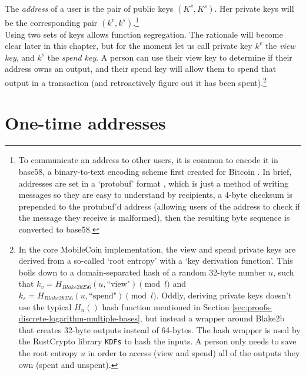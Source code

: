 The {\em address} of a user is the pair of public keys \((K^v, K^s)\). Her private keys will be the corresponding pair \( (k^v, k^s) \).\footnote{To communicate an address to other users, it is common to encode it in base58, a binary-to-text encoding scheme first created for Bitcoin \cite{base-58-encoding}. In brief, addresses are set in a `protobuf' format \cite{protubuf-encoding}, which is just a method of writing messages so they are easy to understand by recipients, a 4-byte checksum is prepended to the protubuf'd address (allowing users of the address to check if the message they receive is malformed), then the resulting byte sequence is converted to base58.}
\\

Using two sets of keys allows function segregation. The rationale will become clear later in this chapter, but for the moment let us call private key $k^v$ the {\em view key}, and $k^s$ the {\em spend key}. A person can use their view key to determine if their address owns an output, and their spend key will allow them to spend that output in a transaction (and retroactively figure out it has been spent).\footnote{\label{footnote:private-keys-and-blake2b256}In the core MobileCoin implementation, the view and spend private keys are derived from a so-called `root entropy' with a `key derivation function'. This boils down to a domain-separated hash of a random 32-byte number $u$, such that $k_v = H_{Blake2b256}(u, \textrm{``view"}) \pmod l$ and $k_s = H_{Blake2b256}(u, \textrm{``spend"}) \pmod l$. Oddly, deriving private keys doesn't use the typical $H_n()$ hash function mentioned in Section \ref{sec:proofs-discrete-logarithm-multiple-bases}, but instead a wrapper around Blake2b that creates 32-byte outputs instead of 64-bytes. The hash wrapper is used by the RustCrypto library {\tt KDFs} \cite{kdfs-rust-lib} to hash the inputs. A person only needs to save the root entropy $u$ in order to access (view and spend) all of the outputs they own (spent and unspent).}



\section{One-time addresses}
\label{sec:one-time-addresses}

